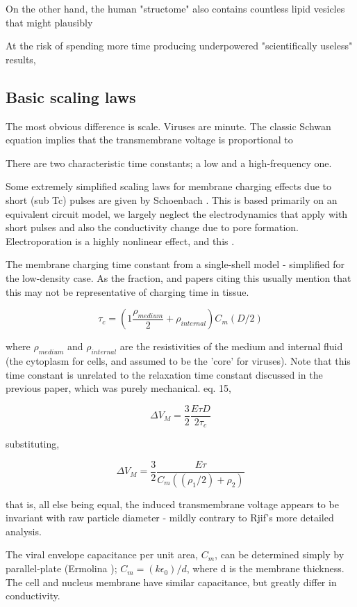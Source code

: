 \documentclass[fleqn,10pt]{paper}
\begin{document}
On the other hand, the human "structome" also contains countless lipid vesicles that might plausibly 





At the risk of spending more time producing underpowered "scientifically useless" results, 

\subsection*{Basic scaling laws}

The most obvious difference is scale. Viruses are minute. The classic Schwan equation implies that the transmembrane voltage is proportional to 

There are two characteristic time constants; a low and a high-frequency one.

Some extremely simplified scaling laws for membrane charging effects due to short (sub Tc) pulses are given by Schoenbach \cite{Bioelectric2007}. This is based primarily on an equivalent circuit model, we largely neglect the electrodynamics that apply with short pulses and also the conductivity change due to pore formation. Electroporation is a highly nonlinear effect\cite{Letter1974}, and this .

The membrane charging time constant from a single-shell model \cite{Ultrashort2004} - simplified for the low-density case. As the fraction, and papers citing this usually mention that this may not be representative of charging time in tissue.

$$\tau_c = \left(1 \frac{\rho_{medium}}{2} + \rho_{internal}\right) C_m (D/2)$$

where $\rho_{medium}$ and $\rho_{internal}$ are the resistivities of the medium and internal fluid (the cytoplasm for cells, and assumed to be the 'core' for viruses). Note that this time constant is unrelated to the relaxation time constant discussed in the previous paper, which was purely mechanical. \cite{Bioelectric2007} eq. 15, 

$$\Delta V_M = \frac{3}{2}\frac{E\tau D}{2 \tau_c }$$

substituting,

$$\Delta V_M = \frac{3}{2}\frac{E \tau}{C_m ((\rho_1/2) + \rho_2)}$$

that is, all else being equal, the induced transmembrane voltage appears to be invariant with raw particle diameter - mildly contrary to Rjif's more detailed analysis.

The viral envelope capacitance per unit area, $C_m$, can be determined simply by parallel-plate (Ermolina \cite{Study2001}); $C_m = (k\epsilon_0) / d$, where d is the membrane thickness. The cell and nucleus membrane have similar capacitance, but greatly differ in conductivity. 
\end{document}
